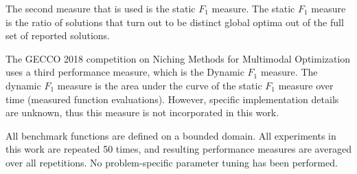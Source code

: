 \documentclass[10pt,a4paper, geometry, fullpage]{article}
\theoremstyle{plain}
\theoremstyle{remark}
\begin{document}
The second measure that is used is the static $F_1$ measure. The static $F_1$ measure is the ratio of solutions that turn out to be distinct global optima out of the full set of reported solutions.

The GECCO 2018 competition on Niching Methods for Multimodal Optimization uses a third performance measure, which is the Dynamic $F_1$ measure. The dynamic $F_1$ measure is the area under the curve of the static $F_1$ measure over time (measured function evaluations). However, specific implementation details are unknown, thus this measure is not incorporated in this work. 

All benchmark functions are defined on a bounded domain. All experiments in this work are repeated 50 times, and resulting performance measures are averaged over all repetitions. No problem-specific parameter tuning has been performed.
\end{document}
